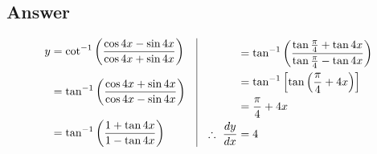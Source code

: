 \documentclass[17pt]{extarticle}
\begin{document}
\begin{fleqn}
\subsection*{Answer}
\begin{equation} \nonumber
\begin{alignedat}{4}
y &=  \cot^{-1}\left(\frac{\cos 4x - \sin 4x}{\cos 4x + \sin 4x}\right)\\[8pt]
  &= \tan^{-1}\left(\frac{\cos 4x + \sin 4x}{\cos 4x - \sin 4x}\right)\\[9pt]
  &= \tan^{-1}\left(\frac{1 + \tan 4x}{1 - \tan 4x}\right)\\
\end{alignedat}
\quad
\vrule
\quad 
\begin{alignedat}{4}
&= \tan^{-1}\left(\frac{\tan \frac{\pi}{4} + \tan 4x}{\tan \frac{\pi}{4} - \tan 4x}\right)\\
&=  \tan^{-1}\left[ \tan \left( \frac{\pi}{4}+4x \right)\right]\\
&=  \frac{\pi}{4}+4x\\
\therefore \  \frac{dy}{dx} &= 4\\
\end{alignedat}
\end{equation}

\end{fleqn}
\end{document}
